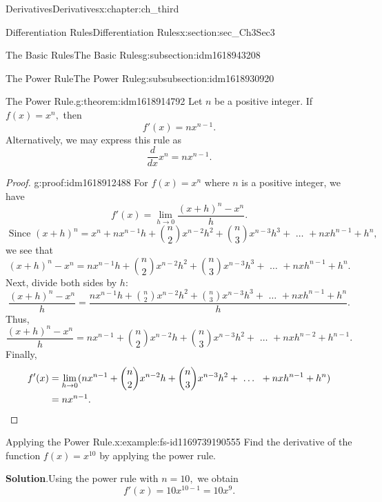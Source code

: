 \documentclass[oneside,10pt,]{book}
\newcommand{\blocktitlefont}{\relax}
\numberwithin{equation}{section}
\newcommand{\qedhere}{\relax}
\newcommand{\amp}{&}
\begin{document}
\begin{chapterptx}{Derivatives}{}{Derivatives}{}{}{x:chapter:ch_third}
\begin{sectionptx}{Differentiation Rules}{}{Differentiation Rules}{}{}{x:section:sec_Ch3Sec3}
\begin{subsectionptx}{The Basic Rules}{}{The Basic Rules}{}{}{g:subsection:idm1618943208}
\begin{subsubsectionptx}{The Power Rule}{}{The Power Rule}{}{}{g:subsubsection:idm1618930920}
\begin{theorem}{The Power Rule.}{}{g:theorem:idm1618914792}%
Let \(n\) be a positive integer. If \(f(x)=x^n,\) then%
%
\begin{equation*}
f'(x)=nx^{n-1}.
\end{equation*}
Alternatively, we may express this rule as%
%
\begin{equation*}
\frac{d}{dx}x^n=nx^{n-1}.
\end{equation*}
\end{theorem}
\begin{proof}{}{g:proof:idm1618912488}
For \(f(x)=x^n\) where \(n\) is a positive integer, we have%
%
\begin{equation*}
f'(x)=\lim_{h\to 0}\frac{(x+h)^n-x^n}{h}.
\end{equation*}
%
\begin{equation*}
\text{ Since } (x+h)^n=x^n+nx^{n-1}h+{n \choose 2} x^{n-2}h^2+{n \choose 3} x^{n-3}h^3+\text{ … }+nxh^{n-1}+h^n,
\end{equation*}
we see that%
%
\begin{equation*}
(x+h)^n-x^n=nx^{n-1}h+{n \choose 2} x^{n-2}h^2+{n \choose 3} x^{n-3}h^3+\text{ … }+nxh^{n-1}+h^n.
\end{equation*}
Next, divide both sides by \(h\):%
%
\begin{equation*}
\frac{(x+h)^n-x^n}{h}=\frac{nx^{n-1}h+{n \choose 2} x^{n-2}h^2+{n \choose 3} x^{n-3}h^3+\text{ … }+nxh^{n-1}+h^n}{h}.
\end{equation*}
Thus,%
%
\begin{equation*}
\frac{(x+h)^n-x^n}{h}=nx^{n-1}+{n \choose 2} x^{n-2}h+{n \choose 3} x^{n-3}h^2+\text{ … }+nxh^{n-2}+h^{n-1}.
\end{equation*}
Finally,%
%
\begin{align*}
f'(x)\amp=\lim_{h\to 0}(nx^{n-1}+{n \choose 2} x^{n-2}h+{n \choose 3} x^{n-3}h^2+\text{ … }+nxh^{n-1}+h^n)\\
\amp=nx^{n-1}.\qedhere
\end{align*}
\end{proof}
\begin{example}{Applying the Power Rule.}{x:example:fs-id1169739190555}%
Find the derivative of the function \(f(x)=x^{10}\) by applying the power rule.%
\par\smallskip%
\noindent\textbf{\blocktitlefont Solution}.\hypertarget{g:solution:idm1618905192}{}\quad{}Using the power rule with \(n=10,\) we obtain%
%
\begin{equation*}
f'(x)=10x^{10-1}=10x^9.
\end{equation*}

\end{example}
\end{subsubsectionptx}
\end{subsectionptx}
\end{sectionptx}
\end{chapterptx}
\end{document}
